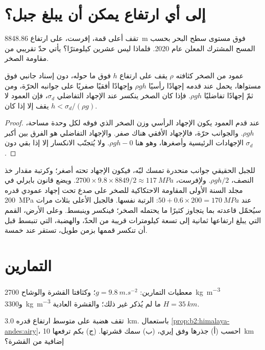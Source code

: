 \section{إلى أي ارتفاع يمكن أن يبلغ جبل؟}\label{sec:b2:himalaya-andes:heights}

تقف أعلى قمة، إفرست، على ارتفاع \qty{8848.86}{m} فوق مستوى سطح البحر بحسب المسح المشترك
المعلن عام 2020. فلماذا ليس عشرين كيلومترًا؟ يأتي حدّ تقريبي من مقاومة الصخر.

\begin{proposition}\label{prop:b2:himalaya-andes:height}
عمود من الصخر كثافته $\rho$ يقف على ارتفاع $h$ فوق ما حوله، دون
إسناد جانبي فوق مستواها، يحمل عند قدمه إجهادًا رأسيًا $\rho g h$
وإجهادًا أفقيًا صفريًا على جوانبه الحرّة، ومن ثمّ إجهادًا تفاضليًا $\rho g h$. فإذا كان
الصخر ينكسر عند الإجهاد التفاضلي $\sigma_d$، فإن العمود لا يقف إلا إذا كان $h < \sigma_d/(\rho
g)$.
\end{proposition}

\begin{proof}
عند قدم العمود يكون الإجهاد الرأسي وزن الصخر الذي فوقه لكل وحدة مساحة،
$\rho g h$. والجوانب حرّة، فالإجهاد الأفقي هناك صفر. والإجهاد التفاضلي
هو الفرق بين أكبر الإجهادات الرئيسية وأصغرها، وهو هنا $\rho g h - 0$.
ولا يُتجنّب الانكسار إلا إذا بقي دون $\sigma_d$.
\end{proof}

للجبل الحقيقي جوانب منحدرة تمسك لبّه، فيكون الإجهاد تحته
أصغر؛ وكرتبة مقدار خذ النصف، $\rho g h/2$. ولإفرست، $2700 \times 9.8
\times 8849/2 \approx \qty{117}{MPa}$. ويضع قانون بايرلي في مجلد السنة الأولى المقاومة
الاحتكاكية للصخر على صدع تحت إجهاد عمودي قدره \qty{200}{MPa} عند $50 + 0.6 \times 200 =
\qty{170}{MPa}$: الرتبة نفسها. فالجبل الأعلى بثلاث مرات سيُحمّل قاعدته بما يتجاوز كثيرًا
ما يحتمله الصخر؛ فينكسر وينبسط. وعلى الأرض، القمم التي يبلغ ارتفاعها ثمانية إلى تسعة كيلومترات
قريبة من الحدّ، والهضبة، التي تنبسط قبل أن تنكسر قممها بزمن طويل، تستقر
عند خمسة.

\section*{التمارين}\label{sec:b2:himalaya-andes:exercises}

معطيات التمارين: $g = \qty{9.8}{m.s^{-2}}$؛ وكثافتا القشرة والوشاح
\qty{2700}{kg.m^{-3}} و\qty{3300}{kg.m^{-3}} ما لم يُذكر غير ذلك؛ والقشرة العادية $H =
\qty{35}{km}$.

\begin{exercise}[$\star$]\label{exo:b2:himalaya-andes:1}
تقف هضبة على متوسط ارتفاع قدره \qty{3.0}{km}. باستعمال
\cref{prop:b2:himalaya-andes:airy}، احسب (أ) جذرها وفق إيري، (ب) سمك قشرتها.
(ج) بكم ترفعها \qty{10}{km} إضافية من القشرة؟
\end{exercise}

